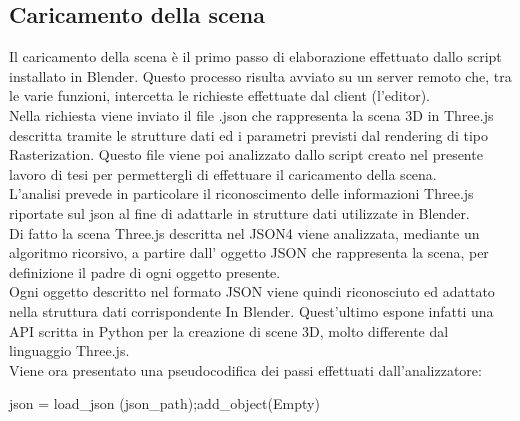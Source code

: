 \subsection{Caricamento della scena}
\label{sec:chapter_baking_service_pipeline_baking_caricam_scena}
Il caricamento della scena è il primo passo di elaborazione effettuato dallo script installato in Blender. Questo processo risulta avviato su un server remoto che, tra le varie funzioni, intercetta le richieste effettuate dal client (l’editor).
\\
Nella richiesta viene inviato il file .json che rappresenta la scena 3D in Three.js descritta tramite le strutture dati ed i parametri previsti dal rendering di tipo Rasterization.
Questo file viene poi analizzato dallo script creato nel presente lavoro di tesi per permettergli di effettuare il caricamento della scena.
\\
L’analisi prevede in particolare il riconoscimento  delle informazioni Three.js riportate sul json al fine di adattarle in strutture dati utilizzate in Blender.
\\
Di fatto la scena Three.js descritta nel JSON4 viene analizzata, mediante un algoritmo ricorsivo, a partire dall’ oggetto JSON che rappresenta la scena, per definizione il padre di ogni oggetto presente.
\\
Ogni oggetto descritto nel formato JSON viene quindi riconosciuto ed adattato nella struttura dati corrispondente In Blender. Quest’ultimo espone infatti una API scritta in Python per la creazione di scene 3D, molto differente dal linguaggio Three.js.
\\
Viene ora presentato una pseudocodifica dei passi effettuati dall’analizzatore:
\\
\begin{algorithm}
	json = load\_json (json\_path);\hspace{5pt}add\_object(Empty)\;
\end{algorithm}
